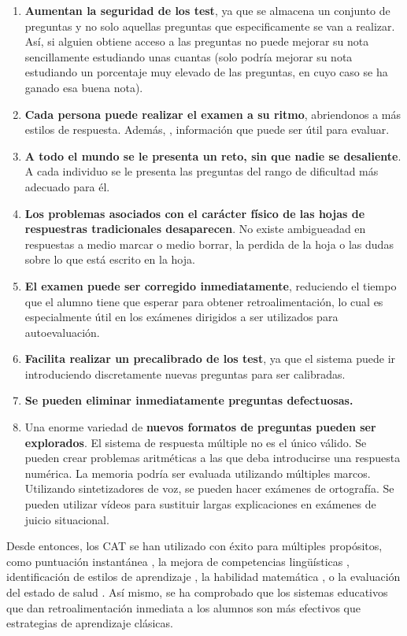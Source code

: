 \begin{enumerate}
	\item \textbf{Aumentan la seguridad de los test}, ya que se almacena un conjunto de preguntas y no solo aquellas preguntas que especificamente se van a realizar. Así, si alguien obtiene acceso a las preguntas no puede mejorar su nota sencillamente estudiando unas cuantas (solo podría mejorar su nota estudiando un porcentaje muy elevado de las preguntas, en cuyo caso se ha ganado esa buena nota).
	\item \textbf{Cada persona puede realizar el examen a su ritmo}, abriendonos a más estilos de respuesta. Además, , información que puede ser útil para evaluar.
	\item \textbf{A todo el mundo se le presenta un reto, sin que nadie se desaliente}. A cada individuo se le presenta las preguntas del rango de dificultad más adecuado para él.
	\item \textbf{Los problemas asociados con el carácter físico de las hojas de respuestras tradicionales desaparecen}. No existe ambigueadad en respuestas a medio marcar o medio borrar, la perdida de la hoja o las dudas sobre lo que está escrito en la hoja.
	\item \textbf{El examen puede ser corregido inmediatamente}, reduciendo el tiempo que el alumno tiene que esperar para obtener retroalimentación, lo cual es especialmente útil en los exámenes dirigidos a ser utilizados para autoevaluación.
	\item \textbf{Facilita realizar un precalibrado de los test}, ya que el sistema puede ir introduciendo discretamente nuevas preguntas para ser calibradas.
	\item \textbf{Se pueden eliminar inmediatamente preguntas defectuosas.}
	\item Una enorme variedad de \textbf{nuevos formatos de preguntas pueden ser explorados}. El sistema de respuesta múltiple no es el único válido. Se pueden crear problemas aritméticas a las que deba introducirse una respuesta numérica. La memoria podría ser evaluada utilizando múltiples marcos. Utilizando sintetizadores de voz, se pueden hacer exámenes de ortografía. Se pueden utilizar vídeos para sustituir largas explicaciones en exámenes de juicio situacional.
\end{enumerate}

Desde entonces, los \acrshort{CAT} se han utilizado con éxito para múltiples propósitos, como puntuación instantánea \cite{Wainer00}, la mejora de competencias lingüísticas \cite{Chapelle06} , identificación de estilos de aprendizaje \cite{Ortigosa10}, la habilidad matemática \cite{Klinkenberg11}, o la evaluación del estado de salud \cite{Revicki97}. Así mismo, se ha comprobado que los sistemas educativos que dan retroalimentación inmediata a los alumnos son más efectivos que estrategias de aprendizaje clásicas\cite{Kumar04}. 

